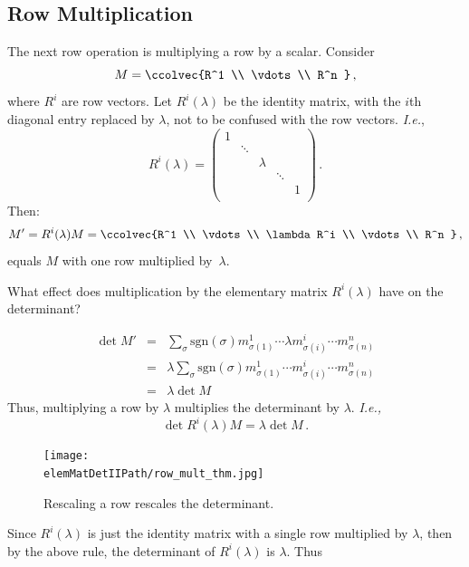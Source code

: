\subsection{Row  Multiplication}
The next row operation is multiplying a row by a scalar.
Consider \[M=\ccolvec{R^1 \\ \vdots \\ R^n }\, ,\] where $R^i$ are row vectors.  Let $R^i(\lambda)$ be the identity matrix, with the $i$th diagonal entry replaced by $\lambda$, not to be confused with the row vectors. {\it I.e.},
\[
R^i(\lambda)=
\begin{pmatrix}
1 & & & & \\
  & \ddots & & & \\
  & & \lambda & & \\
  & & & \ddots & \\
  & & & & 1 \\
\end{pmatrix}
\, .\]
Then:
\[
M'=R^i(\lambda)M=\ccolvec{R^1 \\ \vdots \\ \lambda R^i \\ \vdots \\ R^n }\, ,
\]
equals $M$ with one row multiplied by~$\lambda$.

What effect does multiplication by the elementary matrix $R^i(\lambda)$ have on the determinant?

\begin{eqnarray*}
\det M' & = & \sum_{\sigma} \text{sgn}(\sigma) m^1_{\sigma(1)}\cdots \lambda m^i_{\sigma(i)} \cdots m^n_{\sigma(n)} \\
& = & \lambda \sum_{\sigma} \text{sgn}(\sigma) m^1_{\sigma(1)}\cdots m^i_{\sigma(i)} \cdots m^n_{\sigma(n)} \\
& = & \lambda \det M
\end{eqnarray*}
Thus, multiplying a row by $\lambda$ multiplies the determinant by $\lambda$.
{\it I.e.,} \[\det R^i(\lambda) M = \lambda \det M\, .\]


\begin{figure}
\begin{center}
\texttt{[image: \\elemMatDetIIPath/row\_mult\_thm.jpg]}
\end{center}
\caption{Rescaling a row rescales the determinant.}
\end{figure}


Since $R^i(\lambda)$ is just the identity matrix with a single row multiplied by $\lambda$, then by the above rule, the determinant of $R^i(\lambda)$ is $\lambda$.  Thus

